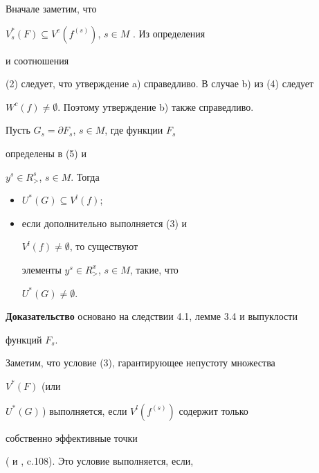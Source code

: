 \begin{pf}


Вначале заметим, что


$V^*_s(F)\subseteq V^e(f^{(s)})$, $s\in M$ \cite{Geo}. Из определения


и соотношения


(2) следует, что утверждение a) справедливо. В случае b) из (4) следует


$W^c(f)\ne\emptyset$. Поэтому утверждение b) также справедливо.


\end{pf}





\begin{cors}


Пусть $G_s=\partial F_s$, $s\in M$, где функции $F_s$


определены в (5) и


$y^s\in R^s_{>}$, $s\in M$. Тогда


\begin{itemize}


\item[a)] $U^*(G)\subseteq V^l(f)$;


\item[b)] если дополнительно выполняется (3) и


$V^l(f)\ne\emptyset$, то существуют


элементы $y^s\in R^x_{>}$, $s\in M$, такие, что


$U^*(G)\ne\emptyset$.


\end{itemize}


\end{cors}





{\bf Доказательство} основано на следствии 4.1, лемме 3.4 и выпуклости


функций $F_s$.


\medskip





Заметим, что условие (3), гарантирующее непустоту множества


$V^*(F)$ (или


$U^*(G)$\,) выполняется, если $V^l(f^{(s)})$ содержит только


собственно эффективные точки


(\cite{Geo} и \cite{Pod2}, c.108). Это условие выполняется, если,


